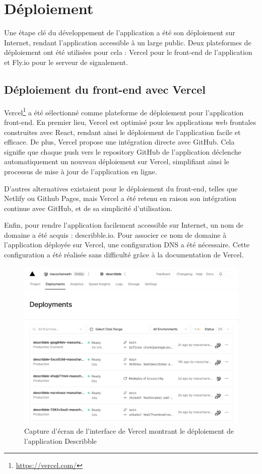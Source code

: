 \section{Déploiement}

Une étape clé du développement de l'application a été son déploiement sur Internet, rendant l'application accessible à un large public. Deux plateformes de déploiement ont été utilisées pour cela : Vercel pour le front-end de l'application et Fly.io pour le serveur de signalement.

\subsection{Déploiement du front-end avec Vercel}

Vercel\footnote{\url{https://vercel.com/}} a été sélectionné comme plateforme de déploiement pour l'application front-end. En premier lieu, Vercel est optimisé pour les applications web frontales construites avec React, rendant ainsi le déploiement de l'application facile et efficace. De plus, Vercel propose une intégration directe avec GitHub. Cela signifie que chaque push vers le repository GitHub de l'application déclenche automatiquement un nouveau déploiement sur Vercel, simplifiant ainsi le processus de mise à jour de l'application en ligne.

D'autres alternatives existaient pour le déploiement du front-end, telles que Netlify ou Github Pages, mais Vercel a été retenu en raison son intégration continue avec GitHub, et de sa simplicité d'utilisation.

Enfin, pour rendre l'application facilement accessible sur Internet, un nom de domaine a été acquis : describble.io. Pour associer ce nom de domaine à l'application déployée sur Vercel, une configuration \Gls{DNS} a été nécessaire. Cette configuration a été réalisée sans difficulté grâce à la documentation de Vercel.

\begin{figure}[H]
    \centering
    \includegraphics[width=1\textwidth]{assets/figures/vercel-deploy.png}
    \caption{Capture d'écran de l'interface de Vercel montrant le déploiement de l'application \Gls{Describble}}
\end{figure}

